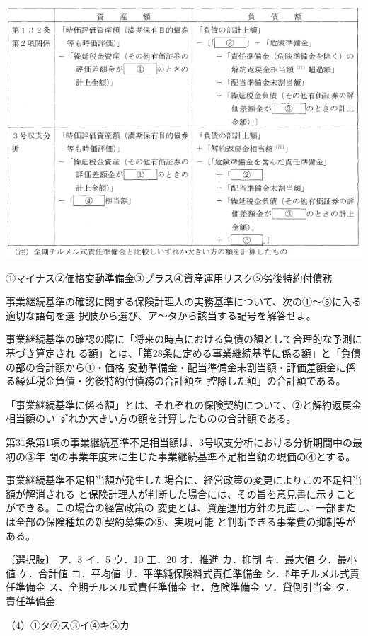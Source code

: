 \documentclass[report,gutter=10mm,fore-edge=10mm,uplatex,dvipdfmx]{jlreq}
\begin{document}
\includegraphics[scale=0.8]{./images/ProbH19-2-1-2.png}

\answer{}
①マイナス②価格変動準備金③プラス④資産運用リスク⑤劣後特約付債務

事業継続基準の確認に関する保険計理人の実務基準について、次の①〜⑤に入る適切な語句を選
択肢から選び、ア〜タから該当する記号を解答せよ。

事業継続基準の確認の際に「将来の時点における負債の額として合理的な予測に基づき算定され
る額」とは、「第28条に定める事業継続基準に係る額」と「負債の部の合計額から①・価格
変動準備金・配当準備金未割当額・評価差額金に係る繰延税金負債・劣後特約付債務の合計額を
控除した額」の合計額である。

「事業継続基準に係る額」とは、それぞれの保険契約について、②と解約返戻金相当額のい
ずれか大きい方の額を計算したものの合計額である。

第31条第1項の事業継続基準不足相当額は、3号収支分析における分析期間中の最初の③年
間の事業年度末に生じた事業継続基準不足相当額の現価の④とする。

事業継続基準不足相当額が発生した場合に、経営政策の変更によりこの不足相当額が解消される
と保険計理人が判断した場合には、その旨を意見書に示すことができる。この場合の経営政策の
変更とは、資産運用方針の見直し、一部または全部の保険種類の新契約募集の⑤、実現可能
と判断できる事業費の抑制等がある。

〔選択肢〕
ア．3
イ．5
ウ．10
工．20
オ．推進
カ．抑制
キ．最大値
ク．最小値
ケ．合計値
コ．平均値
サ．平準純保険料式責任準備金
シ．5年チルメル式責任準備金
ス、全期チルメル式責任準備金
セ．危険準備金
ソ．貸倒引当金
タ．責任準備金

\answer{}
（4）①タ②ス③イ④キ⑤カ
\end{document}
